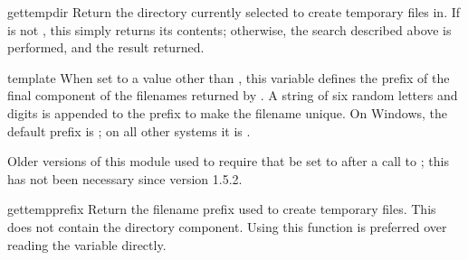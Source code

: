 \begin{funcdesc}{gettempdir}{}
Return the directory currently selected to create temporary files in.
If  is not , this simply returns its contents;
otherwise, the search described above is performed, and the result
returned.
\end{funcdesc}

\begin{datadesc}{template}
When set to a value other than , this variable defines the
prefix of the final component of the filenames returned by
.  A string of six random letters and digits is
appended to the prefix to make the filename unique.  On Windows,
the default prefix is ; on all other systems
it is .

Older versions of this module used to require that  be
set to  after a call to ; this has not
been necessary since version 1.5.2.
\end{datadesc}

\begin{funcdesc}{gettempprefix}{}
Return the filename prefix used to create temporary files.  This does
not contain the directory component.  Using this function is preferred
over reading the  variable directly.
\end{funcdesc}
